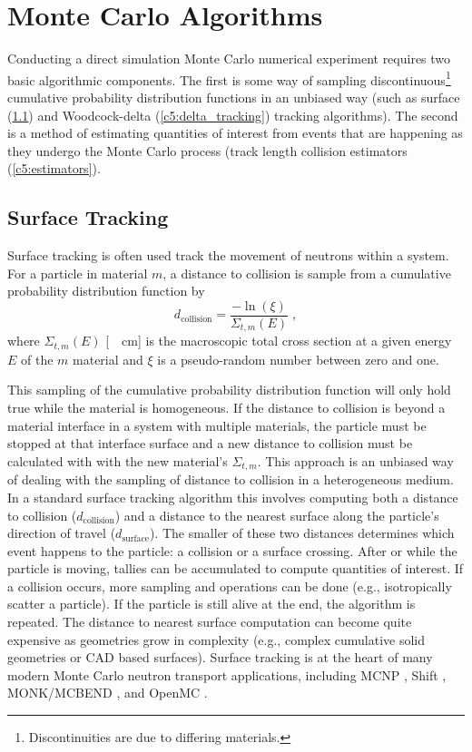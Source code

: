 \section{Monte Carlo Algorithms}

Conducting a direct simulation Monte Carlo numerical experiment requires two basic algorithmic components.
The first is some way of sampling discontinuous\footnote{Discontinuities are due to differing materials.} cumulative probability distribution functions in an unbiased way (such as surface (\ref{c5:surface_tracking}) and Woodcock-delta (\ref{c5:delta_tracking}) tracking algorithms).
The second is a method of estimating quantities of interest from events that are happening as they undergo the Monte Carlo process (track length collision estimators (\ref{c5:estimators}).

\subsection{Surface Tracking}
\label{c5:surface_tracking}

Surface tracking is often used track the movement of neutrons within a system. 
For a particle in material $m$, a distance to collision is sample from a cumulative probability distribution function by
\begin{equation}
    d_{\text{collision}} = \frac{-\ln(\xi)}{\Sigma_{t,m}(E)} \; ,
\end{equation}
where $\Sigma_{t,m}(E)$ [\SI{}{\per\centi\meter}] is the macroscopic total cross section at a given energy $E$ of the $m$ material and $\xi$ is a pseudo-random number between zero and one.

This sampling of the cumulative probability distribution function will only hold true while the material is homogeneous.
If the distance to collision is beyond a material interface in a system with multiple materials, the particle must be stopped at that interface surface and a new distance to collision must be calculated with with the new material's $\Sigma_{t,m}$.
This approach is an unbiased way of dealing with the sampling of distance to collision in a heterogeneous medium.
In a standard surface tracking algorithm this involves computing both a distance to collision ($d_{\text{collision}}$) and a distance to the nearest surface along the particle's direction of travel ($d_{\text{surface}}$).
The smaller of these two distances determines which event happens to the particle: a collision or a surface crossing.
After or while the particle is moving, tallies can be accumulated to compute quantities of interest.
If a collision occurs, more sampling and operations can be done (e.g., isotropically scatter a particle).
If the particle is still alive at the end, the algorithm is repeated.
The distance to nearest surface computation can become quite expensive as geometries grow in complexity (e.g., complex cumulative solid geometries or CAD based surfaces).
Surface tracking is at the heart of many modern Monte Carlo neutron transport applications, including MCNP \cite{MCNP_RisingArmstrongEtAl}, Shift \cite{hamilton_continuous-energy_2019, pandya_implementation_2016}, MONK/MCBEND \cite{richards_monk_2015}, and OpenMC \cite{romano_openmc_2015}.

